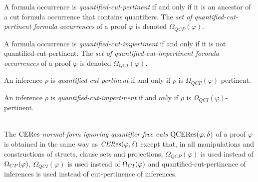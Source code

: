 \newcommand{\occCutPertQuant}[1]{\Omega_{QCP}(#1)}   %
\newcommand{\occCutImpertQuant}[1]{\Omega_{QCI}(#1)}   %
\begin{definition}
\label{definition:ComplexCutPertinenceOccurrences}
A formula occurrence is \emph{quantified-cut-pertinent} if and only if it is an ancestor of a cut formula occurrence that contains quantifiers. The \emph{set of quantified-cut-pertinent formula occurrences} of a proof $\varphi$ is denoted $\occCutPertQuant{\varphi}$.

A formula occurrence is \emph{quantified-cut-impertinent} if and only if it is not quantified-cut-pertinent. The \emph{set of quantified-cut-impertinent formula occurrences} of a proof $\varphi$ is denoted $\occCutImpertQuant{\varphi}$.
\end{definition}

\begin{definition}
\label{definition:CutPertinenceInferences}
An inference $\rho$ is \emph{quantified-cut-pertinent} if and only if $\rho$ is $\occCutPertQuant{\varphi}$-pertinent.

An inference $\rho$ is \emph{quantified-cut-impertinent} if and only if $\rho$ is $\occCutImpertQuant{\varphi}$-pertinent.
\end{definition}

\begin{definition}
\label{definition:CEResNormalFormIgnoringQuantifierFreeCuts} \hspace*{\fill} \\
The \emph{$\mathrm{CERes}$-normal-form ignoring quantifier-free cuts} $\mathrm{QCERes}(\varphi,\delta)$ of a proof $\varphi$ is obtained in the same way as $\mathit{CERes}(\varphi,\delta)$ except that, in all manipulations and constructions of structs, clause sets and projections, $\occCutPertQuant{\varphi}$ is used instead of $\Omega_{CP}(\varphi)$, $\occCutImpertQuant{\varphi}$ is used instead of $\Omega_{CI}(\varphi)$ and quantified-cut-pertinence of inferences is used instead of cut-pertinence of inferences.
\end{definition}

